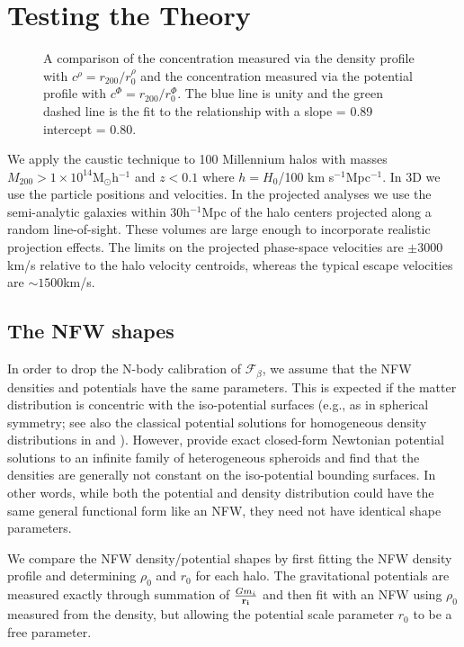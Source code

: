 \documentclass[iop]{emulateapj}
\begin{document}
\section{Testing the Theory}
\label{sec:test}
        \begin{figure}
        \caption{A comparison of the concentration measured via the density profile with $c^{\rho} = r_{200}/r_{0}^{\rho}$ and the concentration measured via the potential profile with $c^{\Phi} = r_{200}/r_0^{\Phi}$. The blue line is unity and the green dashed line is the fit to the relationship with a slope = 0.89 intercept = 0.80.}
        \label{fig:r_0_compare}
        \end{figure}        

We apply the caustic technique to 100 Millennium halos with masses $M_{200} > 1\times10^{14}$M$_{\odot}$h$^{-1}$ and $z < 0.1$ where $h = H_0$/100 km s$^{-1}$Mpc$^{-1}$. In 3D we use the particle positions and velocities. In the projected analyses we use the \citet{Guo11} semi-analytic galaxies within 30h$^{-1}$Mpc of the halo centers projected along a random line-of-sight.  These volumes are large enough to incorporate realistic projection effects. The limits on the projected phase-space velocities are $\pm 3000$km/s relative to the halo velocity centroids, whereas the typical escape velocities are $\sim 1500$km/s. 
        
\subsection{The NFW shapes}\label{sec:NFW_shapes}
        
    In order to drop the N-body calibration of $\mathcal{F}_{\beta}$, we assume that the NFW densities and potentials have the same parameters. This is expected if the matter distribution is concentric with the iso-potential surfaces (e.g., as in spherical symmetry; see also the classical potential solutions for homogeneous density distributions in \citet{Chandra69} and \citet{Binney87}). However, \citet{Conway00} provide exact closed-form Newtonian potential solutions to an infinite family of heterogeneous spheroids and find that the densities are generally not constant on the iso-potential bounding surfaces. In other words, while both the potential and density distribution could have the same general functional form like an NFW, they need not have identical shape parameters. 
    
    We compare the NFW density/potential shapes by first fitting the NFW density profile and determining  $\rho_0$ and $r_0$ for each halo. The gravitational potentials are measured exactly through summation of $\frac{Gm_i}{\bf r_i}$ and then fit with an NFW using $\rho_0$ measured from the density, but allowing the potential scale parameter $r_0$ to be a free parameter.
 
\end{document}
